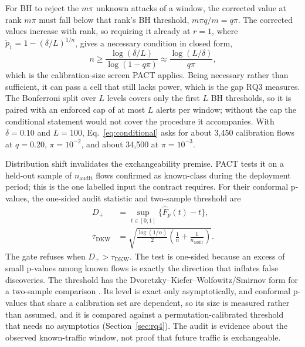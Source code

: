 \documentclass[a4paper,fleqn]{cas-dc}
\newcommand{\PACT}{PACT\xspace}
\begin{document}
For BH to reject the $m\pi$ unknown attacks of a window, the corrected value at rank $m\pi$ must fall below that rank's BH threshold, $m\pi q/m=q\pi$. The corrected values increase with rank, so requiring it already at $r=1$, where $\widetilde p_1=1-(\delta/L)^{1/n}$, gives a necessary condition in closed form,
\begin{equation}
 n \geq \frac{\log(\delta/L)}{\log(1-q\pi)}
 \approx \frac{\log(L/\delta)}{q\pi},
\label{eq:conditional}
\end{equation}
which is the calibration-size screen \PACT applies. Being necessary rather than sufficient, it can pass a cell that still lacks power, which is the gap RQ3 measures.
The Bonferroni split over $L$ levels covers only the first $L$ BH thresholds, so it is paired with an enforced cap of at most $L$ alerts per window; without the cap the conditional statement would not cover the procedure it accompanies. With $\delta=0.10$ and $L=100$, Eq.~\eqref{eq:conditional} asks for about 3{,}450 calibration flows at $q=0.20$, $\pi=10^{-2}$, and about 34{,}500 at $\pi=10^{-3}$.

Distribution shift invalidates the exchangeability premise. \PACT tests it on a held-out sample of $n_{\mathrm{audit}}$ flows confirmed as known-class during the deployment period; this is the one labelled input the contract requires. For their conformal p-values, the one-sided audit statistic and two-sample threshold are
\begin{equation}
 \begin{aligned}
 D_+&=\sup_{t\in[0,1]}\{\widehat F_p(t)-t\},\\
 \tau_{\mathrm{DKW}}&=\sqrt{\frac{\log(1/\alpha)}{2}
 \left(\frac{1}{n}+\frac{1}{n_{\mathrm{audit}}}\right)}.
 \end{aligned}
 \label{eq:audit}
\end{equation}
The gate refuses when $D_+>\tau_{\mathrm{DKW}}$. The test is one-sided because an excess of small p-values among known flows is exactly the direction that inflates false discoveries. The threshold has the Dvoretzky--Kiefer--Wolfowitz/Smirnov form for a two-sample comparison \cite{massart1990dkw}. Its level is exact only asymptotically, and conformal p-values that share a calibration set are dependent, so its size is measured rather than assumed, and it is compared against a permutation-calibrated threshold that needs no asymptotics (Section~\ref{sec:rq4}). The audit is evidence about the observed known-traffic window, not proof that future traffic is exchangeable.
\end{document}
